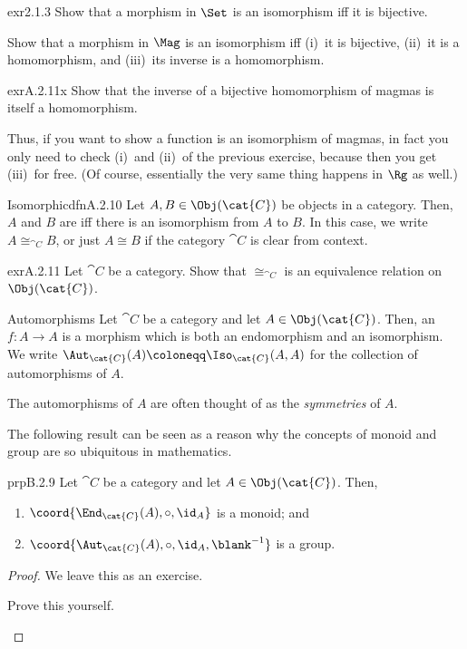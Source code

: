 \begin{exr}{}{exr2.1.3}
Show that a morphism in $\Set$ is an isomorphism iff it is bijective.
\end{exr}
\begin{exr}{}{}
Show that a morphism in $\Mag$ is an isomorphism iff (i)~it is bijective, (ii)~it is a homomorphism, and (iii)~its inverse is a homomorphism.
\end{exr}
\begin{exr}{}{exrA.2.11x}
Show that the inverse of a bijective homomorphism of magmas is itself a homomorphism.
\begin{rmk}
Thus, if you want to show a function is an isomorphism of magmas, in fact you only need to check (i)~and (ii)~of the previous exercise, because then you get (iii)~for free.  (Of course, essentially the very same thing happens in $\Rg$ as well.)
\end{rmk}
\end{exr}
\begin{dfn}{Isomorphic}{dfnA.2.10}
Let $A,B\in \Obj (\cat{C})$ be objects in a category.  Then, $A$ and $B$ are  iff there is an isomorphism from $A$ to $B$.  In this case, we write $A\cong _{\cat{C}}B$, or just $A\cong B$ if the category $\cat{C}$ is clear from context.
\end{dfn}
\begin{exr}{}{exrA.2.11}
Let $\cat{C}$ be a category.  Show that $\cong _{\cat{C}}$ is an equivalence relation on $\Obj (\cat{C})$.
\end{exr}
\begin{dfn}{Automorphisms}{}
Let $\cat{C}$ be a category and let $A\in \Obj (\cat{C})$.  Then, an  $f\colon A\rightarrow A$ is a morphism which is both an endomorphism and an isomorphism.  We write $\Aut _{\cat{C}}(A)\coloneqq \Iso _{\cat{C}}(A,A)$ for the collection of automorphisms of $A$.
\begin{rmk}
The automorphisms of $A$ are often thought of as the \emph{symmetries} of $A$.
\end{rmk}
\end{dfn}
The following result can be seen as a reason why the concepts of monoid and group are so ubiquitous in mathematics.
\begin{prp}{}{prpB.2.9}
Let $\cat{C}$ be a category and let $A\in \Obj (\cat{C})$.  Then,
\begin{enumerate}
\item $\coord{\End _{\cat{C}}(A),\circ ,\id _A}$ is a monoid; and
\item $\coord{\Aut _{\cat{C}}(A),\circ ,\id _A,\blank ^{-1}}$ is a group.
\end{enumerate}
\begin{proof}
We leave this as an exercise.
\begin{exr}[breakable=false]{}{}
Prove this yourself.
\end{exr}
\end{proof}
\end{prp}


